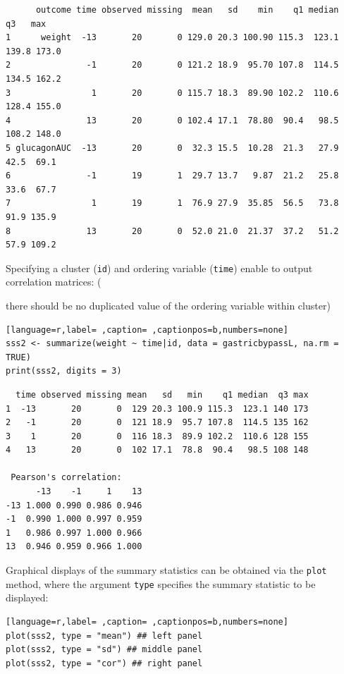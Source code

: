 \documentclass[12pt]{article}
\newcommand\Warning[1][3ex]{%
\renewcommand\stacktype{L}%
\scaleto{\stackon[1.3pt]{\color{red}$\triangle$}{\tiny\bfseries !}}{#1}%
\xspace
}
\begin{document}
\begin{verbatim}
      outcome time observed missing  mean   sd    min    q1 median    q3   max
1      weight  -13       20       0 129.0 20.3 100.90 115.3  123.1 139.8 173.0
2               -1       20       0 121.2 18.9  95.70 107.8  114.5 134.5 162.2
3                1       20       0 115.7 18.3  89.90 102.2  110.6 128.4 155.0
4               13       20       0 102.4 17.1  78.80  90.4   98.5 108.2 148.0
5 glucagonAUC  -13       20       0  32.3 15.5  10.28  21.3   27.9  42.5  69.1
6               -1       19       1  29.7 13.7   9.87  21.2   25.8  33.6  67.7
7                1       19       1  76.9 27.9  35.85  56.5   73.8  91.9 135.9
8               13       20       0  52.0 21.0  21.37  37.2   51.2  57.9 109.2
\end{verbatim}


\noindent Specifying a cluster (\texttt{id}) and ordering variable (\texttt{time})
enable to output correlation matrices: \newline (\Warning there should be
no duplicated value of the ordering variable within cluster)
\begin{lstlisting}[language=r,label= ,caption= ,captionpos=b,numbers=none]
sss2 <- summarize(weight ~ time|id, data = gastricbypassL, na.rm = TRUE)
print(sss2, digits = 3)
\end{lstlisting}

\begin{verbatim}
  time observed missing mean   sd   min    q1 median  q3 max
1  -13       20       0  129 20.3 100.9 115.3  123.1 140 173
2   -1       20       0  121 18.9  95.7 107.8  114.5 135 162
3    1       20       0  116 18.3  89.9 102.2  110.6 128 155
4   13       20       0  102 17.1  78.8  90.4   98.5 108 148

 Pearson's correlation: 
      -13    -1     1    13
-13 1.000 0.990 0.986 0.946
-1  0.990 1.000 0.997 0.959
1   0.986 0.997 1.000 0.966
13  0.946 0.959 0.966 1.000
\end{verbatim}

Graphical displays of the summary statistics can be obtained via the
\texttt{plot} method, where the argument \texttt{type} specifies the summary
statistic to be displayed:
\begin{lstlisting}[language=r,label= ,caption= ,captionpos=b,numbers=none]
plot(sss2, type = "mean") ## left panel
plot(sss2, type = "sd") ## middle panel
plot(sss2, type = "cor") ## right panel
\end{lstlisting}
\end{document}
